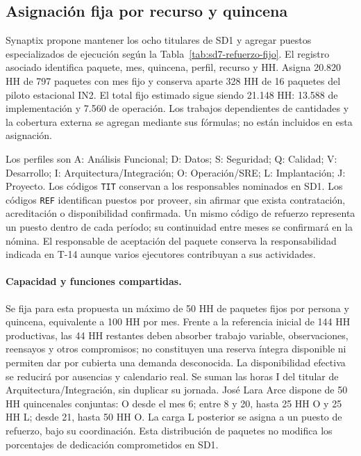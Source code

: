 \subsection{Asignación fija por recurso y quincena}
Synaptix propone mantener los ocho titulares de SD1 y agregar puestos especializados de ejecución según la Tabla~\ref{tab:sd7-refuerzo-fijo}. El registro asociado  identifica paquete, mes, quincena, perfil, recurso y HH. Asigna 20.820 HH de 797 paquetes con mes fijo y conserva aparte 328 HH de 16 paquetes del piloto estacional IN2. El total fijo estimado sigue siendo 21.148 HH: 13.588 de implementación y 7.560 de operación. Los trabajos dependientes de cantidades y la cobertura externa se agregan mediante sus fórmulas; no están incluidos en esta asignación.

Los perfiles son A: Análisis Funcional; D: Datos; S: Seguridad; Q: Calidad; V: Desarrollo; I: Arquitectura/Integración; O: Operación/SRE; L: Implantación; J: Proyecto. Los códigos \texttt{TIT} conservan a los responsables nominados en SD1. Los códigos \texttt{REF} identifican puestos por proveer, sin afirmar que exista contratación, acreditación o disponibilidad confirmada. Un mismo código de refuerzo representa un puesto dentro de cada período; su continuidad entre meses se confirmará en la nómina. El responsable de aceptación del paquete conserva la responsabilidad indicada en T-14 aunque varios ejecutores contribuyan a sus actividades.

\paragraph{Capacidad y funciones compartidas.}
Se fija para esta propuesta un máximo de 50 HH de paquetes fijos por persona y quincena, equivalente a 100 HH por mes. Frente a la referencia inicial de 144 HH productivas, las 44 HH restantes deben absorber trabajo variable, observaciones, reensayos y otros compromisos; no constituyen una reserva íntegra disponible ni permiten dar por cubierta una demanda desconocida. La disponibilidad efectiva se reducirá por ausencias y calendario real. Se suman las horas I del titular de Arquitectura/Integración, sin duplicar su jornada. José Lara Arce dispone de 50 HH quincenales conjuntas: O desde el mes 6; entre 8 y 20, hasta 25 HH O y 25 HH L; desde 21, hasta 50 HH O. La carga L posterior se asigna a un puesto de refuerzo, bajo su coordinación. Esta distribución de paquetes no modifica los porcentajes de dedicación comprometidos en SD1.

